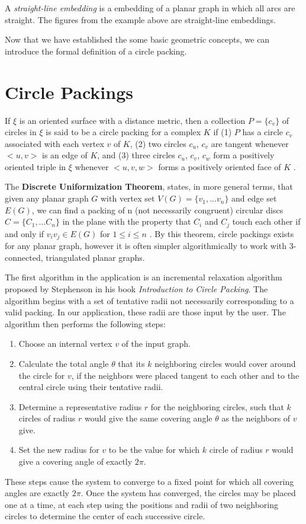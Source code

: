 \documentclass[11pt]{article}
\begin{document}
  A \emph{straight-line embedding} is a embedding of a planar graph in which all arcs are straight. The figures from the example above are straight-line embeddings.

Now that we have established the some basic geometric concepts, we can introduce the formal definition of a circle packing.

\section{Circle Packings}
If $\xi$ is an oriented surface with a distance metric, then a collection $P = \{c_v\}$ of circles in $\xi$ is said to be a circle packing for a complex $K$ if (1) $P$ has a circle $c_v$ associated with each vertex $v$ of $K$, (2) two circles $c_u$, $c_v$ are tangent whenever $<u,v>$ is an edge of $K$, and (3) three circles $c_u$, $c_v$, $c_w$ form a positively oriented triple in $\xi$ whenever $<u,v,w>$ forms a positively oriented face of $K$ \cite{stephenson05introduction}. 

The \textbf{Discrete Uniformization Theorem}, states, in more general terms, that given any planar graph $G$ with vertex set $V(G) = \{v_1, ... v_n \}$ and edge set $E(G)$, we can find a packing of n (not necessarily congruent) circular discs $C= \{C_1,... C_n\}$ in the plane with the property that $C_i$ and $C_j$ touch each other if and only if $v_i v_j \in E(G)$ for $1 \le i \le n$ \cite{stephenson05introduction}.
By this theorem, circle packings exists for any planar graph, however it is often simpler algorithmically to work with 3-connected, triangulated planar graphs.

The first algorithm in the application is an incremental relaxation algorithm proposed by Stephenson in his book \emph{Introduction to Circle Packing}. The algorithm begins with a set of tentative radii not necessarily corresponding to a valid packing. In our application, these radii are those input by the user. The algorithm then performs the following steps:
	\begin{enumerate}
		\item Choose an internal vertex $v$ of the input graph.
		\item Calculate the total angle $\theta$ that its $k$ neighboring circles would cover around the circle for $v$, if the neighbors were placed tangent to each other and to the central circle using their tentative radii.
		\item Determine a representative radius $r$ for the neighboring circles, such that $k$ circles of radius $r$ would give the same covering angle $\theta$ as the neighbors of $v$ give.
		\item Set the new radius for $v$ to be the value for which $k$ circle of radius $r$ would give a covering angle of exactly $2\pi$.
	\end{enumerate}
These steps cause the system to converge to a fixed point for which all covering angles are exactly $2\pi$. Once the system has converged, the circles may be placed one at a time, at each step using the positions and radii of two neighboring circles to determine the center of each successive circle.
\end{document}
